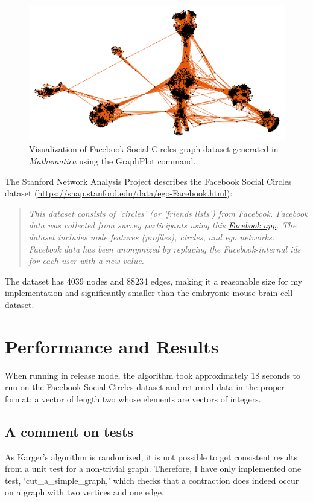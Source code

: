 \documentclass[10pt]{article}
\begin{document}
{\begin{figure}[h!]
	\centering
	\includegraphics[width=0.7\linewidth]{mathematica_vis.png}
	\caption{Visualization of Facebook Social Circles graph dataset generated in {\em Mathematica} using the GraphPlot command.}
\end{figure}

The Stanford Network Analysis Project describes the Facebook Social Circles dataset (\url{https://snap.stanford.edu/data/ego-Facebook.html}):
\begin{quote}
	\em
	This dataset consists of 'circles' (or 'friends lists') from Facebook. Facebook data was collected from survey participants using this \href{https://www.facebook.com/apps/application.php?id=201704403232744}{Facebook app}. The dataset includes node features (profiles), circles, and ego networks. Facebook data has been anonymized by replacing the Facebook-internal ids for each user with a new value. 
\end{quote}
The dataset has 4039 nodes and 88234 edges, making it a reasonable size for my implementation and significantly smaller than the embryonic mouse brain cell \href{https://snap.stanford.edu/biodata/datasets/10023/10023-CC-Neuron.html}{dataset}.

\section{Performance and Results}

When running in release mode, the algorithm took approximately 18 seconds to run on the Facebook Social Circles dataset and returned data in the proper format: a vector of length two whose elements are vectors of integers.

\subsection*{A comment on tests}

As Karger's algorithm is randomized, it is not possible to get consistent results from a unit test for a non-trivial graph.
Therefore, I have only implemented one test, `cut\_a\_simple\_graph,' which checks that a contraction does indeed occur on a graph with two vertices and one edge.



}
\end{document}
